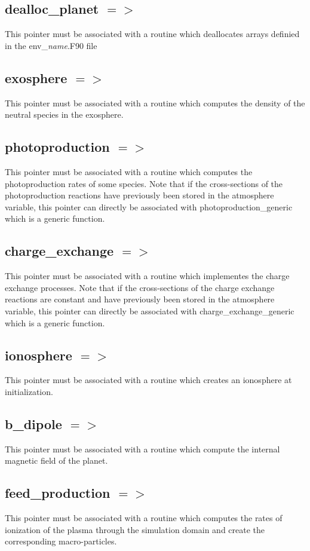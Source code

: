 \documentclass{article}
\begin{document}
\subsection{dealloc\_planet $=>$}
This pointer must be associated with a routine which deallocates arrays definied in the {\sf env\_}{\it name}{\sf .F90} file
\subsection{exosphere $=>$}
This pointer must be associated with a routine which computes the density of the neutral species in the exosphere.
\subsection{photoproduction $=>$}
This pointer must be associated with a routine which computes the photoproduction rates of some species. Note that if the cross-sections of the photoproduction reactions have previously been stored in the {\sf atmosphere} variable, this pointer can directly be associated with {\sf photoproduction\_generic} which is a generic function.
\subsection{charge\_exchange $=>$}
This pointer must be associated with a routine which implementes the charge exchange processes. Note that if the cross-sections of the charge exchange reactions are constant and have previously been stored in the {\sf atmosphere} variable, this pointer can directly be associated with {\sf charge\_exchange\_generic} which is a generic function.
\subsection{ionosphere $=>$}
This pointer must be associated with a routine which creates an ionosphere at initialization.
\subsection{b\_dipole $=>$}
This pointer must be associated with a routine which compute the internal magnetic field of the planet.
\subsection{feed\_production $=>$}
This pointer must be associated with a routine which computes the rates of ionization of the plasma through the simulation domain and create the corresponding macro-particles.
\end{document}
